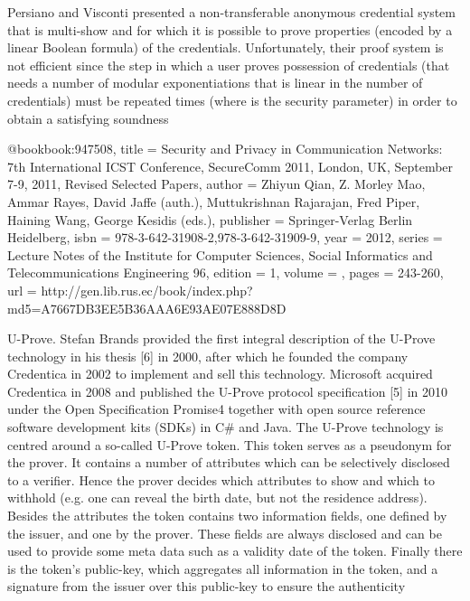 Persiano and Visconti presented a non-transferable anonymous
credential system that is multi-show and for which it is possible to prove
properties (encoded by a linear Boolean formula) of the credentials. Unfortunately,
their proof system is not efficient since the step in which a user proves
possession of credentials (that needs a number of modular exponentiations that
is linear in the number of credentials) must be repeated times (where is the
security parameter) in order to obtain a satisfying soundness



@book{book:947508,
	title =     {Security and Privacy in Communication Networks: 7th International ICST Conference, SecureComm 2011, London, UK, September 7-9, 2011, Revised Selected Papers},
	author =    {Zhiyun Qian, Z. Morley Mao, Ammar Rayes, David Jaffe (auth.), Muttukrishnan Rajarajan, Fred Piper, Haining Wang, George Kesidis (eds.)},
	publisher = {Springer-Verlag Berlin Heidelberg},
	isbn =      {978-3-642-31908-2,978-3-642-31909-9},
	year =      {2012},
	series =    {Lecture Notes of the Institute for Computer Sciences, Social Informatics and Telecommunications Engineering 96},
	edition =   {1},
	volume =    {},
	pages = {243-260},
	url =       {http://gen.lib.rus.ec/book/index.php?md5=A7667DB3EE5B36AAA6E93AE07E888D8D}}

U-Prove. Stefan Brands provided the first integral description of the U-Prove
technology in his thesis [6] in 2000, after which he founded the company Credentica
in 2002 to implement and sell this technology. Microsoft acquired Credentica
in 2008 and published the U-Prove protocol specification [5] in 2010
under the Open Specification Promise4 together with open source reference software
development kits (SDKs) in C# and Java.
The U-Prove technology is centred around a so-called U-Prove token. This
token serves as a pseudonym for the prover. It contains a number of attributes
which can be selectively disclosed to a verifier. Hence the prover decides which
attributes to show and which to withhold (e.g. one can reveal the birth date,
but not the residence address). Besides the attributes the token contains two
information fields, one defined by the issuer, and one by the prover. These fields
are always disclosed and can be used to provide some meta data such as a validity
date of the token. Finally there is the token’s public-key, which aggregates all
information in the token, and a signature from the issuer over this public-key to
ensure the authenticity

